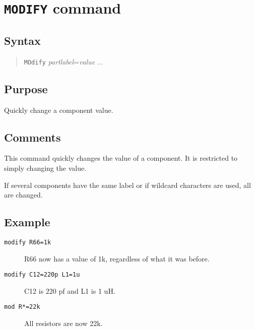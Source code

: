\section{{\tt MODIFY} command}
\subsection{Syntax}
\begin{verse}
{\tt MOdify} {\it partlabel}={\it value} ...
\end{verse}
\subsection{Purpose}

Quickly change a component value.
\subsection{Comments}

This command quickly changes the value of a component.  It is restricted to
simply changing the value.

If several components have the same label or if wildcard characters are
used, all are changed.
\subsection{Example}

\begin{description}

\item[{\tt modify R66=1k}] R66 now has a value of 1k, regardless of what it
was before.

\item[{\tt modify C12=220p L1=1u}] C12 is 220 pf and L1 is 1 uH.

\item[{\tt mod R*=22k}] All resistors are now 22k.

\end{description}
